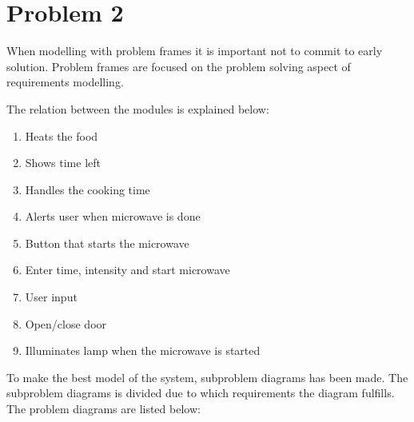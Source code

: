 \chapter{Problem 2}
When modelling with problem frames it is important not to commit to early solution. Problem frames are focused on the problem solving aspect of requirements modelling. 


The relation between the modules is explained below:

\begin{enumerate}[label=\alph*:]
	\item Heats the food
	\item Shows time left
	\item Handles the cooking time
	\item Alerts user when microwave is done
	\item Button that starts the microwave 
	\item Enter time, intensity and start microwave
	\item User input
	\item Open/close door
	\item Illuminates lamp when the microwave is started
	 
\end{enumerate}

To make the best model of the system, subproblem diagrams has been made. The subproblem diagrams is divided due to which requirements the diagram fulfills. 
The problem diagrams are listed below:






